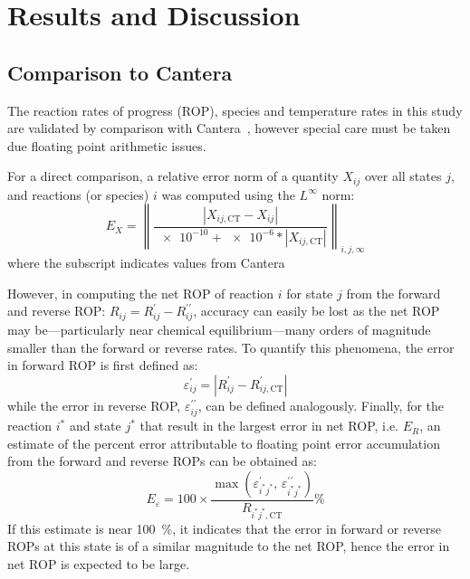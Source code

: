 \documentclass[12pt]{ussci}
\begin{document}
\section{Results and Discussion}
\subsection{Comparison to Cantera}
The reaction rates of progress (ROP), species and temperature rates in this study are validated by comparison with Cantera~\cite{Cantera}, however special care must be taken due floating point arithmetic issues.

For a direct comparison, a relative error norm of a quantity $X_{ij}$ over all states $j$, and reactions (or species) $i$ was computed using the $L^{\infty}$ norm:
\begin{equation}
E_{X} = \left\lVert \frac{\left\lvert X_{ij,\text{CT}} - X_{ij}\right\rvert}{\num{e-10} + \num{e-6} * \left\lvert X_{ij,\text{CT}} \right\rvert} \right\rVert_{i,j,\infty}
\label{e:rel_err}
\end{equation}
where the  subscript indicates values from Cantera~\cite{Cantera}

However, in computing the net ROP of reaction $i$ for state $j$ from the forward and reverse ROP: $R_{ij} = R_{ij}^{\prime} - R_{ij}^{\prime\prime}$, accuracy can easily be lost as the net ROP may be---particularly near chemical equilibrium---many orders of magnitude smaller than the forward or reverse rates.
To quantify this phenomena, the error in forward ROP is first defined as:
\begin{equation}
\varepsilon^{\prime}_{ij} = \left\lvert R_{ij}^{\prime} - R_{ij,\text{CT}}^{\prime} \right\rvert
\end{equation}
while the error in reverse ROP, $\varepsilon^{\prime\prime}_{ij}$, can be defined analogously.
Finally, for the reaction $i^{*}$ and state $j^{*}$ that result in the largest error in net ROP, i.e. $E_{R}$, an estimate of the percent error attributable to floating point error accumulation from the forward and reverse ROPs can be obtained as:
\begin{equation}
E_{\varepsilon} = 100\times\frac{\max(\varepsilon^{\prime}_{i^{*}j^{*}}\text{, }\varepsilon^{\prime\prime}_{i^{*}j^{*}})}{R_{i^{*}j^{*},\text{CT}}} \si{\percent}
\end{equation}
If this estimate is near \SI{100}{\percent}, it indicates that the error in forward or reverse ROPs at this state is of a similar magnitude to the net ROP, hence the error in net ROP is expected to be large.
\end{document}
